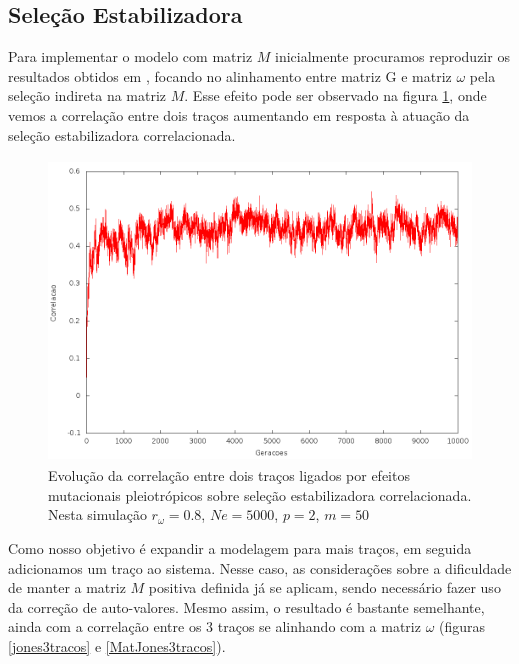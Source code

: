 \documentclass[a4paper, 12pt, titlepage, onecolumn]{article}
\numberwithin{equation}{section}
\numberwithin{table}{section}
\begin{document}
\subsection{Seleção Estabilizadora}

Para implementar o modelo com matriz $M$ inicialmente procuramos
reproduzir os resultados obtidos em \cite{Jones2007}, focando no
alinhamento entre matriz G e matriz $\omega$ pela seleção indireta na
matriz $M$. Esse efeito pode ser observado na figura \ref{jones2tracos},
onde vemos a correlação entre dois traços aumentando em resposta à
atuação da seleção estabilizadora correlacionada.  

\begin{center}
\begin{figure}[H]
  \includegraphics[width=150mm, height=80mm]{figuras/jones2tracos.png}
  \caption{Evolução da correlação entre dois traços ligados por efeitos
  mutacionais pleiotrópicos sobre seleção estabilizadora correlacionada.
  Nesta simulação $r_\omega=0.8$, $Ne=5000$, $p=2$, $m=50$}
  \label{jones2tracos}
\end{figure}
\end{center}

Como nosso objetivo é expandir a modelagem para mais traços, em seguida
adicionamos um traço ao sistema. Nesse caso, as considerações sobre a
dificuldade de manter a matriz $M$ positiva definida já se aplicam,
sendo necessário fazer uso da correção de auto-valores. Mesmo assim, o
resultado é bastante semelhante, ainda com a correlação entre os 3 traços
se alinhando com a matriz $\omega$ (figuras
\ref{jones3tracos} e \ref{MatJones3tracos}). 
\end{document}
